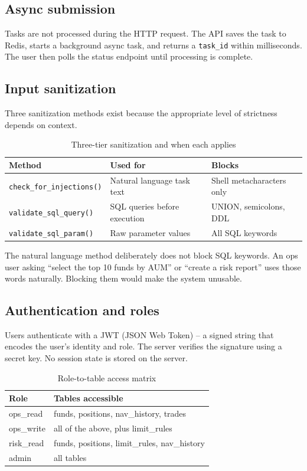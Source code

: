 \documentclass[12pt,a4paper]{article}
\begin{document}
\subsection{Async submission}

Tasks are not processed during the HTTP request. The API saves the task to Redis, starts a background async task, and returns a \texttt{task\_id} within milliseconds. The user then polls the status endpoint until processing is complete.

\subsection{Input sanitization}

Three sanitization methods exist because the appropriate level of strictness depends on context.

\begin{table}[H]
\centering
\small
\begin{tabular}{@{}p{4.8cm}p{4.8cm}p{4.1cm}@{}}
\toprule
\textbf{Method} & \textbf{Used for} & \textbf{Blocks} \\
\midrule
\texttt{check\_for\_injections()} & Natural language task text & Shell metacharacters only \\
\texttt{validate\_sql\_query()}   & SQL queries before execution & UNION, semicolons, DDL \\
\texttt{validate\_sql\_param()}   & Raw parameter values         & All SQL keywords \\
\bottomrule
\end{tabular}
\caption{Three-tier sanitization and when each applies}
\end{table}

The natural language method deliberately does not block SQL keywords. An ops user asking ``select the top 10 funds by AUM'' or ``create a risk report'' uses those words naturally. Blocking them would make the system unusable.

\subsection{Authentication and roles}

Users authenticate with a JWT (JSON Web Token) -- a signed string that encodes the user's identity and role. The server verifies the signature using a secret key. No session state is stored on the server.

\begin{table}[H]
\centering
\small
\begin{tabular}{@{}p{2.8cm}p{10.5cm}@{}}
\toprule
\textbf{Role} & \textbf{Tables accessible} \\
\midrule
ops\_read  & funds, positions, nav\_history, trades \\
ops\_write & all of the above, plus limit\_rules \\
risk\_read & funds, positions, limit\_rules, nav\_history \\
admin      & all tables \\
\bottomrule
\end{tabular}
\caption{Role-to-table access matrix}
\end{table}
\end{document}
